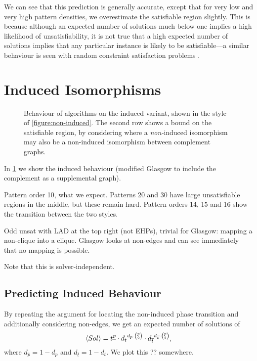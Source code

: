 \documentclass[letterpaper]{article}
\begin{document}
We can see that this prediction is generally accurate, except that for very low and very high
pattern densities, we overestimate the satisfiable region slightly. This is because although an
expected number of solutions much below one implies a high likelihood of unsatisfiability, it is not
true that a high expected number of solutions implies that any particular instance is likely to be
satisfiable---a similar behaviour is seen with random constraint satisfaction problems
\citep{Smith:1994,Smith:1996}.

\section{Induced Isomorphisms}

\begin{figure*}[tb]
    
    \caption{Behaviour of algorithms on the induced variant, shown in the style
    of \cref{figure:non-induced}. The second row shows a bound on the satisfiable region, by
    considering where a \emph{non-}induced isomorphism may also be a non-induced isomorphism between
    complement graphs.}\label{figure:induced}
\end{figure*}

In \cref{figure:induced} we show the induced behaviour (modified Glasgow to include the complement
as a supplemental graph).

Pattern order 10, what we expect. Patterns 20 and 30 have large unsatisfiable regions in the middle,
but these remain hard. Pattern orders 14, 15 and 16 show the transition between the two styles.

Odd unsat with LAD at the top right (not EHPs), trivial for Glasgow: mapping a non-clique into a
clique. Glasgow looks at non-edges and can see immediately that no mapping is possible.

Note that this is solver-independent.

\subsection{Predicting Induced Behaviour}

By repeating the argument for locating the non-induced phase transition and additionally considering
non-edges, we get an expected number of solutions of \[ \langle Sol \rangle = t^{\underline{p}}
\cdot {d_t}^{d_p \cdot \binom{p}{2}} \cdot {d_{\overline{t}}}^{d_{\overline{p}} \cdot \binom{p}{2}}
\textnormal{,} \] where $d_{\overline{p}} = 1 - d_p$ and $d_{\overline{t}} = 1 - d_t$. We plot this
?? somewhere.
\end{document}
